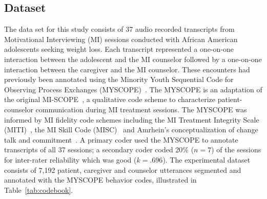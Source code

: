 \subsection{Dataset}
\label{subsec:dataset}
The data set for this study consists of 37 audio recorded transcripts from Motivational Interviewing (MI) sessions conducted with African American adolescents seeking weight loss. Each transcript represented a one-on-one interaction between the adolescent and the MI counselor followed by a one-on-one interaction between the caregiver and the MI counselor. These encounters had previously been annotated using the Minority Youth Sequential Code for Observing Process Exchanges (MYSCOPE)~\cite{carcone2013provider}. The MYSCOPE is an adaptation of the original MI-SCOPE~\cite{martin2005motivational}, a qualitative code scheme to characterize patient-counselor communication during MI treatment sessions. The MYSCOPE was informed by MI fidelity code schemes including the MI Treatment Integrity Scale (MITI)~\cite{moyers2005assessing}, the MI Skill Code (MISC)~\cite{apodaca2007motivational} and Amrhein's conceptualization of change talk and commitment~\cite{amrhein2004does}. A primary coder used the MYSCOPE to annotate transcripts of all 37 sessions; a secondary coder coded 20\% ($n = 7$) of the sessions for inter-rater reliability which was good ($k = .696$). The experimental dataset consists of 7,192 patient, caregiver and counselor utterances segmented and annotated with the MYSCOPE behavior codes, illustrated in Table~\ref{tab:codebook}.

